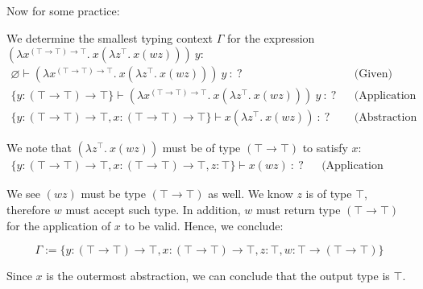 \noindent
Now for some practice: 
\begin{Example}

    We determine the smallest typing context $\Gamma$ for the expression $(\lambda x ^{(\top \to \top) \to \top} .\ x(\lambda z^{\top}.\ x(wz)))\ y$:
    \begin{align*}
         \varnothing \vdash (\lambda x ^{(\top \to \top) \to \top} .\ x(\lambda z^{\top}.\ x(wz)))\ y\ :\ ?&& \text{(Given)}\\
         \{y: (\top \to \top)\to\top\} \vdash  (\lambda x ^{(\top \to \top) \to \top} .\ x(\lambda z^{\top}.\ x(wz)))\ y\ :\ ?&& \text{(Application Arg.)}\\
            \{y: (\top \to \top)\to\top, x: (\top \to \top) \to \top\} \vdash x(\lambda z^{\top}.\ x(wz))\ :\ ?&& \text{(Abstraction Type Sub.)}
    \end{align*}

    \noindent
    We note that $(\lambda z^{\top}.\ x(wz))$ must be of type $(\top \to \top)$ to satisfy $x$:
    \begin{align*}
        \{y: (\top \to \top)\to\top, x: (\top \to \top) \to \top, z: \top\} \vdash x(wz)\ :\ ?&& \text{(Application Arg.)}
    \end{align*}

    \noindent
    We see $(wz)$ must be type $(\top \to \top)$ as well. We know $z$ is of type $\top$, therefore $w$ must accept such type. In addition, 
    $w$ must return type $(\top \to \top)$ for the application of $x$ to be valid. Hence, we conclude:
    
    $$\Gamma := \{y: (\top \to \top)\to\top, x: (\top \to \top) \to \top, z: \top, w: \top \to (\top \to \top)\}$$

    \noindent
    Since $x$ is the outermost abstraction, we can conclude that the output type is $\top$.
\end{Example}

\newpage 

